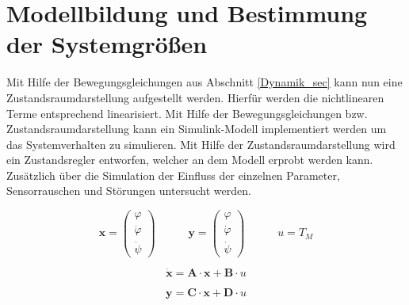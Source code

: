 \section{Modellbildung und Bestimmung der Systemgrößen}
Mit Hilfe der Bewegungsgleichungen aus Abschnitt \ref{Dynamik_sec} kann nun eine Zustandsraumdarstellung aufgestellt werden. Hierfür werden die nichtlinearen Terme entsprechend linearisiert. Mit Hilfe der Bewegungsgleichungen bzw. Zustandsraumdarstellung kann ein Simulink-Modell implementiert werden um das Systemverhalten zu simulieren. Mit Hilfe der Zustandsraumdarstellung wird ein Zustandsregler entworfen, welcher an dem Modell erprobt werden kann. Zusätzlich über die Simulation der Einfluss der einzelnen Parameter, Sensorrauschen und Störungen untersucht werden.

\begin{equation}
\textbf{x} = \begin{pmatrix}
\varphi \\ \dot{\varphi} \\ \dot{\psi}
\end{pmatrix}
\hspace{35pt}
\textbf{y} = \begin{pmatrix}
\varphi \\ \dot{\varphi} \\ \dot{\psi}
\end{pmatrix}
\hspace{35pt}
u = T_M
\end{equation}

\begin{equation}
\dot{\textbf{x}} = \textbf{A} \cdot \textbf{x} + \textbf{B} \cdot u
\end{equation}

\begin{equation}
\textbf{y} = \textbf{C} \cdot \textbf{x} + \textbf{D} \cdot u
\end{equation}

